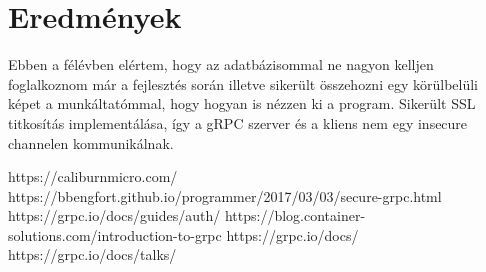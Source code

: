 \documentclass[conference]{IEEEtran}
\begin{document}
\section*{Eredmények}
Ebben a félévben elértem, hogy az adatbázisommal ne nagyon kelljen foglalkoznom már a fejlesztés során illetve sikerült összehozni egy körülbelüli képet a munkáltatómmal, hogy hogyan is nézzen ki a program. Sikerült SSL titkosítás implementálása, így a gRPC szerver és a kliens nem egy insecure channelen kommunikálnak.

\begin{thebibliography}{00}
 https://caliburnmicro.com/
 https://bbengfort.github.io/programmer/2017/03/03/secure-grpc.html
 https://grpc.io/docs/guides/auth/
 https://blog.container-solutions.com/introduction-to-grpc
 https://grpc.io/docs/
 https://grpc.io/docs/talks/
\end{thebibliography}
\vspace{12pt}
\end{document}
